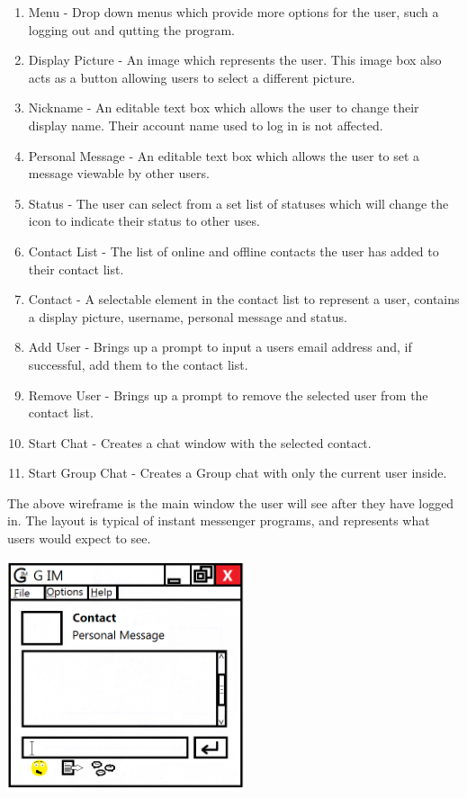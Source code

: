 \begin{enumerate}

\item Menu - Drop down menus which provide more options for the user, such a logging out and qutting the program.
 
\item Display Picture - An image which represents the user. This image box also acts as a button allowing users to select a different picture.

\item Nickname - An editable text box which allows the user to change their display name. Their account name used to log in is not affected.

\item Personal Message - An editable text box which allows the user to set a message viewable by other users.

\item Status - The user can select from a set list of statuses which will change the icon to indicate their status to other uses.

\item Contact List - The list of online and offline contacts the user has added to their contact list.

\item Contact - A selectable element in the contact list to represent a user, contains a display picture, username, personal message and status.

\item Add User - Brings up a prompt to input a users email address and, if successful, add them to the contact list.

\item Remove User - Brings up a prompt to remove the selected user from the contact list.

\item Start Chat - Creates a chat window with the selected contact.

\item Start Group Chat - Creates a Group chat with only the current user inside. 

\end{enumerate}

The above wireframe is the main window the user will see after they have logged in. The layout is typical of instant messenger programs, and represents what users would expect to see.

\includegraphics[width=7cm]{Design/diagrams/Chat_Box.png}

